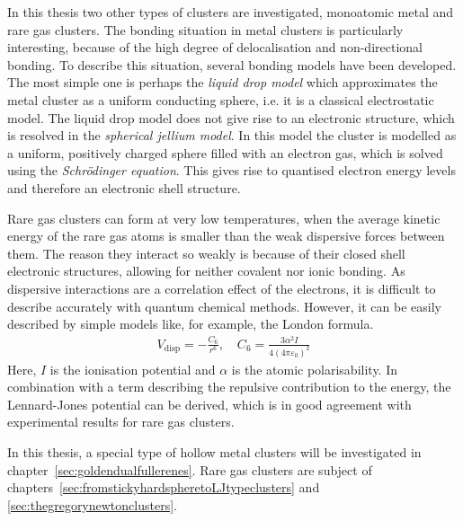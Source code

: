 In this thesis two other types of clusters are investigated, monoatomic metal
and rare gas clusters. The bonding situation in metal clusters is particularly
interesting, because of the high degree of delocalisation and non-directional
bonding. To describe this situation, several bonding models have been developed.
The most simple one is perhaps the \emph{liquid drop model} which approximates
the metal cluster as a uniform conducting sphere, i.e. it is a classical
electrostatic model. The liquid drop model does not give rise to an electronic
structure, which is resolved in the \textit{spherical jellium model}. In this
model the cluster is modelled as a uniform, positively charged sphere filled
with an electron gas, which is solved using the \textit{Schr\"odinger equation}.
This gives rise to quantised electron energy levels and therefore an electronic
shell structure.

Rare gas clusters can form at very low temperatures, when the average kinetic
energy of the rare gas atoms is smaller than the weak dispersive forces between
them. The reason they interact so weakly is because of their closed shell
electronic structures, allowing for neither covalent nor ionic bonding. As dispersive interactions are a correlation effect of the electrons, it is difficult to describe accurately with quantum chemical methods. However, it can be easily described by simple models like, for example, the London formula.
%
\begin{align}
    V_\text{disp}=-\frac{C_6}{r^6},\quad C_6=\frac{3\alpha^2I}{4\left(4\pi\varepsilon_0\right)^2}
\end{align}
Here, $I$ is the ionisation potential and $\alpha$ is the atomic polarisability.
In combination with a term describing the repulsive contribution to the energy,
the Lennard-Jones potential can be derived, which is in good agreement with
experimental results for rare gas clusters.


In this thesis, a special type of hollow metal clusters will be investigated in
chapter~\ref{sec:goldendualfullerenes}. Rare gas clusters are subject of
chapters~\ref{sec:fromstickyhardspheretoLJtypeclusters} and
\ref{sec:thegregorynewtonclusters}.

